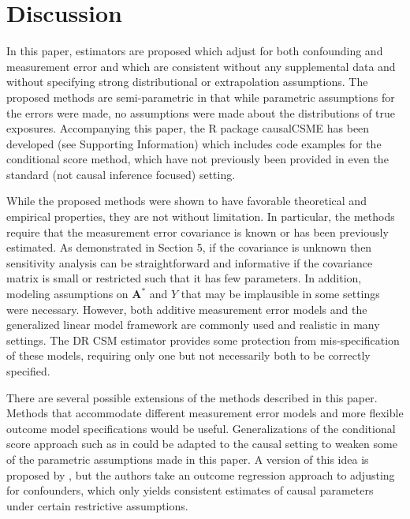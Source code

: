 \documentclass[useAMS,usenatbib,referee]{biom}
\begin{document}
\section{Discussion}

In this paper, estimators are proposed which adjust for both confounding and measurement error and which are consistent without any supplemental data and without specifying strong distributional or extrapolation assumptions. The proposed methods are semi-parametric in that while parametric assumptions for the errors were made, no assumptions were made about the distributions of true exposures. Accompanying this paper, the R package causalCSME has been developed (see Supporting Information) which includes code examples for the conditional score method, which have not previously been provided in even the standard (not causal inference focused) setting.

While the proposed methods were shown to have favorable theoretical and empirical properties, they are not without limitation. In particular, the methods require that the measurement error covariance is known or has been previously estimated. As demonstrated in Section 5, if the covariance is unknown then sensitivity analysis can be straightforward and informative if the covariance matrix is small or restricted such that it has few parameters. In addition, modeling assumptions on $\bm{A}^{*}$ and $Y$ that may be implausible in some settings were necessary. However, both additive measurement error models and the generalized linear model framework are commonly used and realistic in many settings. The DR CSM estimator provides some protection from mis-specification of these models, requiring only one but not necessarily both to be correctly specified.

There are several possible extensions of the methods described in this paper. Methods that accommodate different measurement error models and more flexible outcome model specifications would be useful. Generalizations of the conditional score approach such as in \citet{tsiatis2004} could be adapted to the causal setting to weaken some of the parametric assumptions made in this paper. A version of this idea is proposed by \citet{liu2017}, but the authors take an outcome regression approach to adjusting for confounders, which only yields consistent estimates of causal parameters under certain restrictive assumptions.
\end{document}
